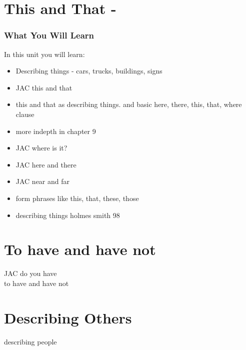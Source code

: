 \begin{multicols}
\cite{walcpp49}
\index{}
\chapter{This and That - }
\subsection{What You Will Learn}
In this unit you will learn:
\begin{itemize}
\item Describing things - cars, trucks, buildings, signs
\item JAC this and that
\item this and that as describing things.  and basic here, there, this, that, where clause
\item more indepth in chapter 9
\item JAC where is it?
\item JAC here and there
\item JAC near and far
\item form phrases like this, that, these, those
\item describing things holmes smith 98
\end{itemize}\newpage

\newpage{}
\chapter{To have and have not}
JAC do you have\\
to have and have not\\
\chapter{Describing Others}
describing people\\
\index{}

\end{multicols}
